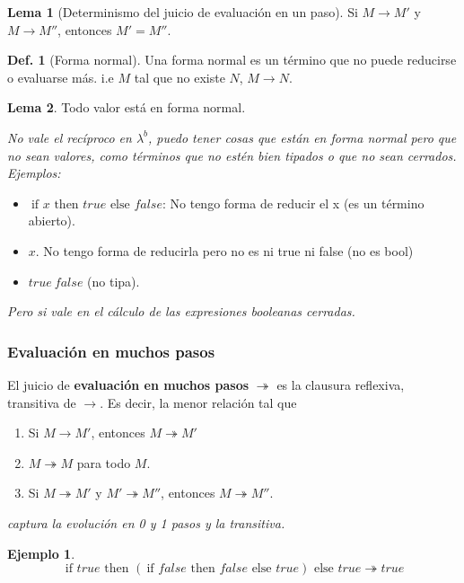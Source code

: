 \documentclass{report}
\theoremstyle{definition} %
\newtheorem{lemma}{Lema}[chapter]
\newtheorem{definition}{Def.}[chapter]
\newtheorem*{example*}{Ejemplo}
\newcommand{\lambdab}{\lambda^b}
\newcommand{\ifte}[3]{\ \text{if } #1 \text{ then } #2 \text{ else } #3}
\newcommand{\app}[2]{#1 \ #2} %
\newcommand{\reduces}{\to}
\newcommand{\reduce}[2]{#1 \reduces #2}
\newcommand{\reduceManyTo}{\twoheadrightarrow}
\newcommand{\reduceMany}[2]{#1 \reduceManyTo #2}
\begin{document}
\begin{lemma}[Determinismo del juicio de evaluación en un paso]
    Si $\reduce{M}{M'}$ y $\reduce{M}{M''}$, entonces $M' = M''$.
\end{lemma}

\begin{definition}[Forma normal]
    Una forma normal es un término que no puede reducirse o evaluarse más. i.e
    $M$ tal que no existe $N$, $\reduce{M}{N}$.
\end{definition}
\begin{lemma}
    Todo valor está en forma normal.

    \textit{No vale el recíproco en $\lambdab$, puedo tener cosas que están en forma normal pero que no sean valores, como términos que no estén bien tipados o que no sean cerrados. Ejemplos:}
    
    \begin{itemize}
        \item $\ifte{x}{true}{false}$: No tengo forma de reducir el x (es un término abierto).
        \item $x$. No tengo forma de reducirla pero no es ni true ni false (no
        es bool)
        \item $\app{true}{false}$ (no tipa).
    \end{itemize}
    
    \textit{Pero si vale en el cálculo de las expresiones booleanas cerradas.}
\end{lemma}

\subsubsection{Evaluación en muchos pasos}

El juicio de \textbf{evaluación en muchos pasos} $\reduceManyTo$ es la
clausura reflexiva, transitiva de $\to$. Es decir, la menor relación tal que

\begin{enumerate}
    \item Si $\reduce{M}{M'}$, entonces $\reduceMany{M}{M'}$
    \item $\reduceMany{M}{M}$ para todo $M$.
    \item Si $\reduceMany{M}{M'}$ y $\reduceMany{M'}{M''}$, entonces $\reduceMany{M}{M''}$.
\end{enumerate}

\textit{captura la evolución en 0 y 1 pasos y la transitiva.}

\begin{example*}
    \[
    \reduceMany
        {\ifte{true}{(\ifte{false}{false}{true})}{true}}
        {true}
    \]
\end{example*}
\end{document}
